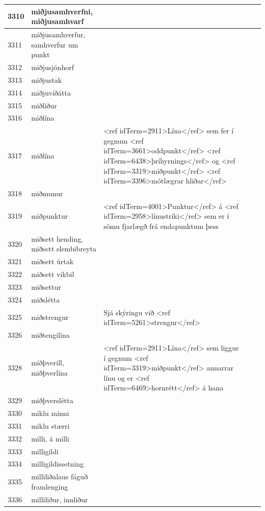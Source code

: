 \begin{longtable}{p{}|p{}|p{}|p{}|p{}}
\hline
3310 & miðjusamhverfni, miðjusamhvarf &  &  &  \\
\hline
3311 & miðjusamhverfur, samhverfur um punkt &  &  &  \\
\hline
3312 & miðjusjónhorf &  &  &  \\
\hline
3313 & miðjustak &  &  &  \\
\hline
3314 & miðjuvíðátta &  &  &  \\
\hline
3315 & miðliður &  &  &  \\
\hline
3316 & miðlína &  &  &  \\
\hline
3317 & miðlína & <ref idTerm=2911>Lína</ref> sem fer í gegnum <ref idTerm=3661>oddpunkt</ref> <ref idTerm=6438>þríhyrnings</ref> og <ref idTerm=3319>miðpunkt</ref> <ref idTerm=3396>mótlægrar hliðar</ref> &  &  \\
\hline
3318 & miðmunur &  &  &  \\
\hline
3319 & miðpunktur & <ref idTerm=4001>Punktur</ref> á <ref idTerm=2958>línustriki</ref> sem er í sömu fjarlægð frá endapunktum þess &  &  \\
\hline
3320 & miðsett hending, miðsett slembibreyta &  &  &  \\
\hline
3321 & miðsett úrtak &  &  &  \\
\hline
3322 & miðsett vikbil &  &  &  \\
\hline
3323 & miðsettur &  &  &  \\
\hline
3324 & miðslétta &  &  &  \\
\hline
3325 & miðstrengur & Sjá skýringu við <ref idTerm=5261>strengur</ref> &  &  \\
\hline
3326 & miðtengilína &  &  &  \\
\hline
3328 & miðþverill, miðþverlína & <ref idTerm=2911>Lína</ref> sem liggur í gegnum <ref idTerm=3319>miðpunkt</ref> annarrar línu og er <ref idTerm=6469>hornrétt</ref> á hana &  &  \\
\hline
3329 & miðþverslétta &  &  &  \\
\hline
3330 & miklu minni &  &  &  \\
\hline
3331 & miklu stærri &  &  &  \\
\hline
3332 & milli, á milli &  &  &  \\
\hline
3333 & milligildi &  &  &  \\
\hline
3334 & milligildissetning &  &  &  \\
\hline
3335 & milliliðalaus fáguð framlenging &  &  &  \\
\hline
3336 & milliliður, innliður &  &  &  \\

\end{longtable}
